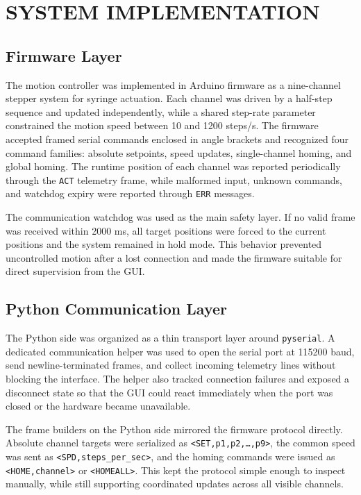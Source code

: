 
\section{SYSTEM IMPLEMENTATION}

\subsection{Firmware Layer}
The motion controller was implemented in Arduino firmware as a nine-channel stepper system for syringe actuation. Each channel was driven by a half-step sequence and updated independently, while a shared step-rate parameter constrained the motion speed between 10 and 1200 steps/s. The firmware accepted framed serial commands enclosed in angle brackets and recognized four command families: absolute setpoints, speed updates, single-channel homing, and global homing. The runtime position of each channel was reported periodically through the \texttt{ACT} telemetry frame, while malformed input, unknown commands, and watchdog expiry were reported through \texttt{ERR} messages.

The communication watchdog was used as the main safety layer. If no valid frame was received within 2000 ms, all target positions were forced to the current positions and the system remained in hold mode. This behavior prevented uncontrolled motion after a lost connection and made the firmware suitable for direct supervision from the GUI.

\subsection{Python Communication Layer}
The Python side was organized as a thin transport layer around \texttt{pyserial}. A dedicated communication helper was used to open the serial port at 115200 baud, send newline-terminated frames, and collect incoming telemetry lines without blocking the interface. The helper also tracked connection failures and exposed a disconnect state so that the GUI could react immediately when the port was closed or the hardware became unavailable.

The frame builders on the Python side mirrored the firmware protocol directly. Absolute channel targets were serialized as \texttt{<SET,p1,p2,\dots,p9>}, the common speed was sent as \texttt{<SPD,steps\_per\_sec>}, and the homing commands were issued as \texttt{<HOME,channel>} or \texttt{<HOMEALL>}. This kept the protocol simple enough to inspect manually, while still supporting coordinated updates across all visible channels.

